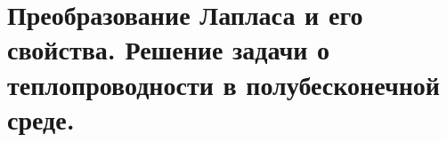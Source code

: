 \chapter{Преобразование Лапласа и его свойства. Решение задачи о
теплопроводности в полубесконечной среде.}

\newpage
